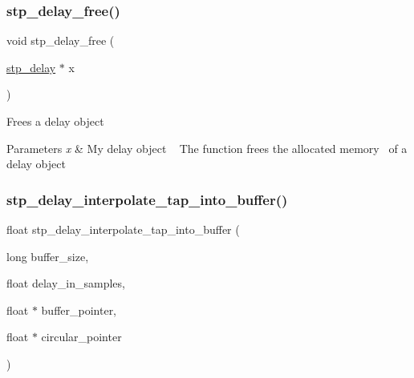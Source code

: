\subsubsection{\texorpdfstring{stp\+\_\+delay\+\_\+free()}{stp\_delay\_free()}}
{\footnotesize\ttfamily void stp\+\_\+delay\+\_\+free (\begin{DoxyParamCaption}\item[{\hyperlink{structstp__delay}{stp\+\_\+delay} $\ast$}]{x }\end{DoxyParamCaption})\hspace{0.3cm}{\ttfamily [related]}}



Frees a delay object~\newline
 


\begin{DoxyParams}{Parameters}
{\em x} & My delay object ~\newline
 The function frees the allocated memory~\newline
 of a delay object \\
\hline
\end{DoxyParams}
\mbox{\label{structstp__delay_ae1939d094a58d97c948543a0fc87e89a}} 
\subsubsection{\texorpdfstring{stp\+\_\+delay\+\_\+interpolate\+\_\+tap\+\_\+into\+\_\+buffer()}{stp\_delay\_interpolate\_tap\_into\_buffer()}}
{\footnotesize\ttfamily float stp\+\_\+delay\+\_\+interpolate\+\_\+tap\+\_\+into\+\_\+buffer (\begin{DoxyParamCaption}\item[{long}]{buffer\+\_\+size,  }\item[{float}]{delay\+\_\+in\+\_\+samples,  }\item[{float $\ast$}]{buffer\+\_\+pointer,  }\item[{float $\ast$}]{circular\+\_\+pointer }\end{DoxyParamCaption})\hspace{0.3cm}{\ttfamily [related]}}



